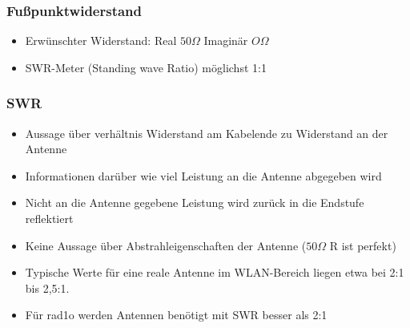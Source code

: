 %


\begin{frame}
    \frametitle{Fußpunktwiderstand}
    \begin{center}
	\begin{itemize}
		\item Erwünschter Widerstand: Real $50 \Omega$ Imaginär $O \Omega$
		\item SWR-Meter (Standing wave Ratio) möglichst 1:1
    \end{itemize}
 	\end{center}
\end{frame}

\begin{frame}
    \frametitle{SWR}
    \begin{center}
	\begin{itemize}
		\item Aussage über verhältnis Widerstand am Kabelende zu Widerstand an der Antenne
		\item Informationen darüber wie viel Leistung an die Antenne abgegeben wird
		\item Nicht an die Antenne gegebene Leistung wird zurück in die Endstufe reflektiert
		\item Keine Aussage über Abstrahleigenschaften der Antenne ($50 \Omega$ R ist perfekt)
		\item Typische Werte für eine reale Antenne im WLAN-Bereich liegen etwa bei 2:1 bis 2,5:1.
		\item Für rad1o werden Antennen benötigt mit SWR besser als 2:1
    \end{itemize}
 	\end{center}
\end{frame}

